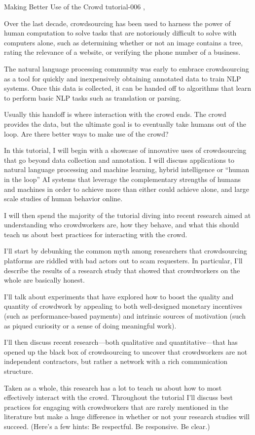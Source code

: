 \begin{tutorial}
  {Making Better Use of the Crowd}
  {tutorial-006}
  {\daydateyear, \tutorialafternoontime}
  {\TutLocF}

Over the last decade, crowdsourcing has been used to harness the power of human computation to solve tasks that are notoriously difficult to solve with computers alone, such as determining whether or not an image contains a tree, rating the relevance of a website, or verifying the phone number of a business.

The natural language processing community was early to embrace crowdsourcing as a tool for quickly and inexpensively obtaining annotated data to train NLP systems. Once this data is collected, it can be handed off to algorithms that learn to perform basic NLP tasks such as translation or parsing.

Usually this handoff is where interaction with the crowd ends. The crowd provides the data, but the ultimate goal is to eventually take humans out of the loop. Are there better ways to make use of the crowd?

In this tutorial, I will begin with a showcase of innovative uses of crowdsourcing that go beyond data collection and annotation. I will discuss applications to natural language processing and machine learning, hybrid intelligence or “human in the loop” AI systems that leverage the complementary strengths of humans and machines in order to achieve more than either could achieve alone, and large scale studies of human behavior online.

I will then spend the majority of the tutorial diving into recent research aimed at understanding who crowdworkers are, how they behave, and what this should teach us about best practices for interacting with the crowd.

I’ll start by debunking the common myth among researchers that crowdsourcing platforms are riddled with bad actors out to scam requesters. In particular, I’ll describe the results of a research study that showed that crowdworkers on the whole are basically honest.

I’ll talk about experiments that have explored how to boost the quality and quantity of crowdwork by appealing to both well-designed monetary incentives (such as performance-based payments) and intrinsic sources of motivation (such as piqued curiosity or a sense of doing meaningful work).

I’ll then discuss recent research—both qualitative and quantitative—that has opened up the black box of crowdsourcing to uncover that crowdworkers are not independent contractors, but rather a network with a rich communication structure.

Taken as a whole, this research has a lot to teach us about how to most effectively interact with the crowd. Throughout the tutorial I’ll discuss best practices for engaging with crowdworkers that are rarely mentioned in the literature but make a huge difference in whether or not your research studies will succeed. (Here’s a few hints: Be respectful. Be responsive. Be clear.)
\end{tutorial}
